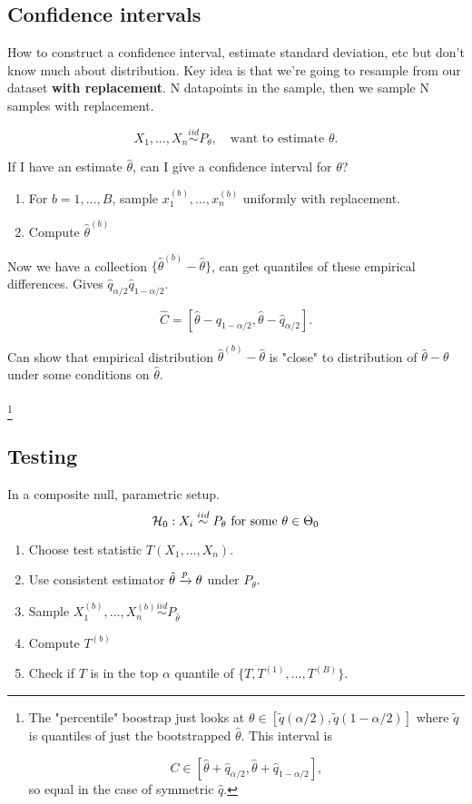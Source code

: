 \documentclass{article}
\newcommand{\simiid}{\overset{iid}\sim }
\begin{document}
\subsection{Confidence intervals}
How to construct a confidence interval, estimate standard deviation, etc but don't know much about distribution. Key idea is that we're going to resample from our dataset \textbf{with replacement}. N datapoints in the sample, then we sample N samples with replacement. 

$$X_1,\ldots, X_n \simiid P_\theta, \quad \text {want to estimate } \theta.$$

If I have an estimate $\hat \theta$, can I give a confidence interval for $\theta$? 

\begin{enumerate}
	\item For $b=1,\ldots, B$, sample $x_1^{(b)},\ldots, x_{n}^{(b)}$ uniformly with replacement.
	\item Compute $\hat \theta^{(b)}$ 
\end{enumerate}

Now we have a collection $\{\hat \theta^{(b)} - \hat \theta\}$, can get quantiles of these empirical differences. Gives $\hat q_{\alpha/2} \hat q_{1-\alpha/2}$. 

$$\hat C = [\hat \theta - q_{1-\alpha/2}, \hat \theta -\hat q_{\alpha/ 2}].$$

Can show that empirical distribution $\hat \theta ^{(b)}- \hat \theta$ is "close" to distribution of $\hat \theta - \theta$ under some conditions on $\hat \theta$. \\\\

\footnote{The "percentile" boostrap just looks at $\theta \in [\tilde q (\alpha/2), \tilde q(1-\alpha/2)]$ where $\tilde q$ is quantiles of just the bootstrapped $\hat \theta$. This interval is 

$$C\in [\hat \theta + \hat q_{\alpha/2}, \hat \theta + \hat q _{1-\alpha/2}],$$
so equal in the case of symmetric $\hat q$. }


\subsection{Testing}
In a composite null, parametric setup. 
$$\calH_0: X_i \simiid P_{\theta} \text{ for some } \theta\in \Theta_0$$

\begin{enumerate}
	\item Choose test statistic $T(X_1,\ldots, X_n)$. 
	\item Use consistent estimator $\hat \theta \xrightarrow{p} \theta$ under $P_\theta$. 
	\item Sample $X_1^{(b)}, \ldots, X_n^{(b)} \simiid P_{\hat \theta}$
	\item Compute $T^{(b)}$
	\item Check if $T$ is in the top $\alpha$ quantile of $\{T,T^{(1)},\ldots, T^{(B)}\}$. 
\end{enumerate}
\end{document}
